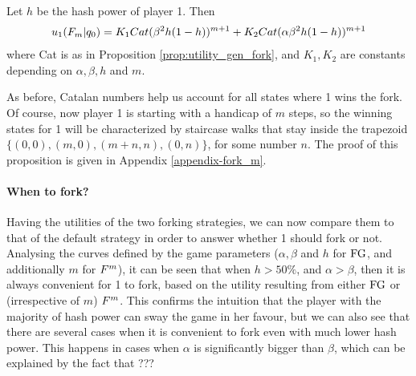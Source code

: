 \begin{myprop}\label{prop-fork_m}
	Let $h$ be the hash power of player 1. Then
	\begin{eqnarray*}
		u_1(F_m|q_0) =K_{1}Cat(\beta^2h(1-h))^{m+1}+K_{2}Cat(\alpha\beta^2h(1-h))^{m+1}
	\end{eqnarray*}
	where Cat is as in Proposition \ref{prop:utility_gen_fork}, and $K_1,K_2$ are constants depending on $\alpha,\beta,h$ and $m$.
\end{myprop}

As before, Catalan numbers help us account for all states where 1 wins the fork. Of course, now player 1 is starting with a handicap of $m$ steps, so the winning states for 1 will be characterized by staircase walks that stay inside the trapezoid $\{(0,0),(m,0),(m+n,n),(0,n)\}$, for some number $n$. The proof of this proposition is given in Appendix \ref{appendix-fork_m}.

\paragraph{When to fork?} Having the utilities of the two forking strategies, we can now compare them to that of the default strategy in order to answer whether 1 should fork or not. Analysing the curves defined by the game parameters ($\alpha,\beta$ and $h$ for $\text{\rm FG}$, and additionally $m$ for $F^{m}$), it can be seen that when $h>50\%$, and $\alpha>\beta$, then it is always convenient for 1 to fork, based on the utility resulting from either $\text{\rm FG}$ or (irrespective of $m$) $F^{m}$. This confirms the intuition that the player with the majority of hash power can sway the game in her favour, but we can also see that there are several cases when it is convenient to fork even with much lower hash power. This happens in cases when $\alpha$ is significantly bigger than $\beta$, which can be explained by the fact that ???

